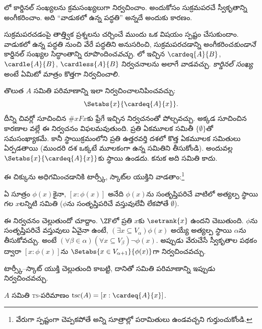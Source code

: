\documentclass[../../../include/open-logic-section]{subfiles}
\begin{document}

లో
కార్డినల్ సంఖ్యలను క్రమసంఖ్యలుగా నిర్వచించాం.
అందుకోసం సుక్రమపరచే స్వీకృతాన్ని అంగీకరించాం.
అది ``వాడుకలో ఉన్న పద్ధతి'' అన్నదే అందుకు కారణం.

సుక్రమపరచడంపై తాత్త్విక ప్రశ్నలను చర్చించే ముందు ఒక విషయం
స్పష్టం చేసుకుందాం. వాడుకలో ఉన్న పద్ధతి నుంచి
వేరే పద్ధతిని అనుసరించి, సుక్రమపరచడాన్ని అంగీకరించ\emph{కుండానే}
కార్డినల్ సంఖ్యల సిద్ధాంతాన్ని రూపొందించ\emph{వచ్చు}.
లో ఇచ్చిన $\cardeq{A}{B}$,
$\cardle{A}{B}$, $\cardless{A}{B}$ నిర్వచనాలను అలాగే
వాడవచ్చు. \emph{కార్డినల్ సంఖ్య} అంటే ఏమిటో మాత్రం కొత్తగా నిర్వచించాలి.

తొలుత $A$ సమితి పరిమాణాన్ని ఇలా నిర్వచించాలనిపించవచ్చు:
\[
	\Setabs{x}{\cardeq{A}{x}}.
\]
దీన్ని  చివర్లో సూచించిన $\# x Fx$కు ఫ్రేగే ఇచ్చిన నిర్వచనంతో పోల్చవచ్చు. అక్కడ సూచించిన కారణాల వల్లే ఈ నిర్వచనం విఫలమవుతుంది. ప్రతి ఏకమూలక సమితీ $\{\emptyset\}$తో సమసంఖ్యాకమే. కానీ స్థాయిక్రమంలోని ప్రతి ఉత్తరవర్తి దశలో కొత్త ఏకమూలక సమితులు ఏర్పడతాయి (ముందరి దశ ఒక్కటే మూలకంగా ఉన్న సమితిని తీసుకోండి). అందువల్ల $\Setabs{x}{\cardeq{A}{x}}$కు స్థాయి ఉండదు. కనుక అది సమితి కాదు.

ఈ చిక్కును అధిగమించడానికి టార్స్కీ, స్కాట్‌ల యుక్తిని వాడతాం:\footnote{వేరుగా స్పష్టంగా చెప్పకపోతే అన్ని సూత్రాల్లో పరామితులు ఉండవచ్చని గుర్తుంచుకోండి.}

\begin{defn}[టార్స్కీ--స్కాట్]
ఏ సూత్రం $\phi(x)$కైనా, $[ x : \phi(x)] $ అనేది
$\phi(x)$ను సంతృప్తిపరిచే వాటిలో అత్యల్ప స్థాయి గల
$x$లన్నిటి సమితి ($\phi$ను సంతృప్తిపరిచే వస్తువులేవీ లేకపోతే $\emptyset$).
\end{defn}

ఈ నిర్వచనం చెల్లుతుందో చూద్దాం. $\ZF$లో ప్రతి $x$కు
$\setrank{x}$ ఉందని 
చెబుతుంది. $\phi$ను సంతృప్తిపరిచే వస్తువులు ఏవైనా ఉంటే,
$(\exists x\subseteq V_\alpha)\phi(x)$ అయ్యే అత్యల్ప స్థాయి
$\alpha$ను తీసుకోవచ్చు. అంటే
$(\forall \beta \in \alpha)(\forall x \subseteq V_\beta)\lnot \phi(x)$.
అప్పుడు వేరుచేసే స్వీకృతాల పథకం ద్వారా $[x : \phi(x)]$ను
$\Setabs{x \in V_{\alpha+1}}{\phi(x)}$గా నిర్వచించవచ్చు.

టార్స్కీ--స్కాట్ యుక్తి చెల్లుతుంది కాబట్టి, దానితో సమితి పరిమాణాన్ని ఇప్పుడు నిర్వచించవచ్చు.

\begin{defn}
$A$ సమితి \textsc{ts}-పరిమాణం $\text{tsc}(A) = [x :
\cardeq{A}{x}]$.
\end{defn}
\end{document}
